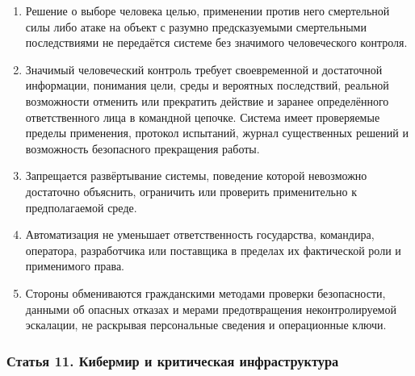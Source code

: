 \documentclass[
  russian,
  11pt,
  a4paper,
]{article}
\providecommand{\tightlist}{%
  \setlength{\itemsep}{0pt}\setlength{\parskip}{0pt}}
\begin{document}
\begin{enumerate}
\def\labelenumi{\arabic{enumi}.}
\tightlist
\item
  Решение о выборе человека целью, применении против него смертельной
  силы либо атаке на объект с разумно предсказуемыми смертельными
  последствиями не передаётся системе без значимого человеческого
  контроля.
\item
  Значимый человеческий контроль требует своевременной и достаточной
  информации, понимания цели, среды и вероятных последствий, реальной
  возможности отменить или прекратить действие и заранее определённого
  ответственного лица в командной цепочке. Система имеет проверяемые
  пределы применения, протокол испытаний, журнал существенных решений и
  возможность безопасного прекращения работы.
\item
  Запрещается развёртывание системы, поведение которой невозможно
  достаточно объяснить, ограничить или проверить применительно к
  предполагаемой среде.
\item
  Автоматизация не уменьшает ответственность государства, командира,
  оператора, разработчика или поставщика в пределах их фактической роли
  и применимого права.
\item
  Стороны обмениваются гражданскими методами проверки безопасности,
  данными об опасных отказах и мерами предотвращения неконтролируемой
  эскалации, не раскрывая персональные сведения и операционные ключи.
\end{enumerate}

\subsubsection{Статья 11. Кибермир и критическая
инфраструктура}\label{ux441ux442ux430ux442ux44cux44f-11-ux43aux438ux431ux435ux440ux43cux438ux440-ux438-ux43aux440ux438ux442ux438ux447ux435ux441ux43aux430ux44f-ux438ux43dux444ux440ux430ux441ux442ux440ux443ux43aux442ux443ux440ux430}
\end{document}
